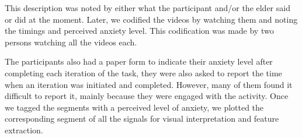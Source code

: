 This description was noted by either what the participant 
and/or the elder said or did at the moment. Later,
we codified the videos by watching them and noting 
the timings and perceived anxiety level. This codification 
was made by two persons watching all the videos each.


The participants also had a paper form to indicate their
anxiety level after completing each iteration of the task,
they were also asked to report the time when an iteration
was initiated and completed. However, many of them found 
it difficult to report it, mainly because they were engaged 
with the activity. 
Once we tagged the segments with a perceived level of 
anxiety, we plotted the corresponding segment of all the
signals for visual interpretation and feature extraction.
\newpage

